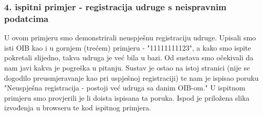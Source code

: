 			 
			 
			  \subsubsection{4. ispitni primjer - registracija udruge s neispravnim podatcima}
			 
			 U ovom primjeru smo demonstrirali neuspješnu registraciju udruge. Upisali smo isti OIB kao i u gornjem (trećem) primjeru - "11111111123", a kako smo ispite pokretali slijedno, takva udruga je već bila u bazi. Od sustava smo očekivali da nam javi kakva je pogreška u pitanju. Sustav je ostao na istoj stranici (nije se dogodilo preusmjeravanje kao pri uspješnoj registraciji) te nam je ispisao poruku "Neuspješna registracija - postoji već udruga sa danim OIB-om." U ispitnom primjeru smo provjerili je li doista ispisana ta poruka. Ispod je priložena slika izvođenja u browseru te kod ispitnog primjera. 
			 
